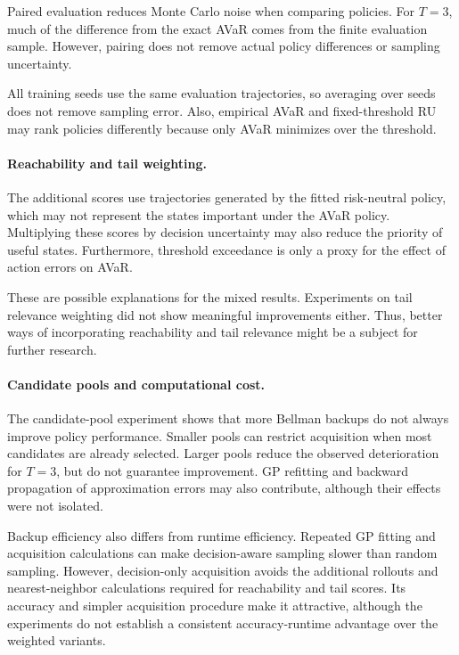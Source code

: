Paired evaluation reduces Monte Carlo noise when comparing policies. For $T=3$, much of the difference from the exact AVaR comes from the finite evaluation sample. However, pairing does not remove actual policy differences or sampling uncertainty.

All training seeds use the same evaluation trajectories, so averaging over seeds does not remove sampling error. Also, empirical AVaR and fixed-threshold RU may rank policies differently because only AVaR minimizes over the threshold.

\paragraph{Reachability and tail weighting.}

The additional scores use trajectories generated by the fitted risk-neutral policy, which may not represent the states important under the AVaR policy. Multiplying these scores by decision uncertainty may also reduce the priority of useful states. Furthermore, threshold exceedance is only a proxy for the effect of action errors on AVaR.

These are possible explanations for the mixed results. Experiments on tail relevance weighting did not show meaningful improvements either. Thus, better ways of incorporating reachability and tail relevance might be a subject for further research.

\paragraph{Candidate pools and computational cost.}

The candidate-pool experiment shows that more Bellman backups do not always improve policy performance. Smaller pools can restrict acquisition when most candidates are already selected. Larger pools reduce the observed deterioration for $T=3$, but do not guarantee improvement. GP refitting and backward propagation of approximation errors may also contribute, although their effects were not isolated.

Backup efficiency also differs from runtime efficiency. Repeated GP fitting and acquisition calculations can make decision-aware sampling slower than random sampling. However, decision-only acquisition avoids the additional rollouts and nearest-neighbor calculations required for reachability and tail scores. Its accuracy and simpler acquisition procedure make it attractive, although the experiments do not establish a consistent accuracy-runtime advantage over the weighted variants.

